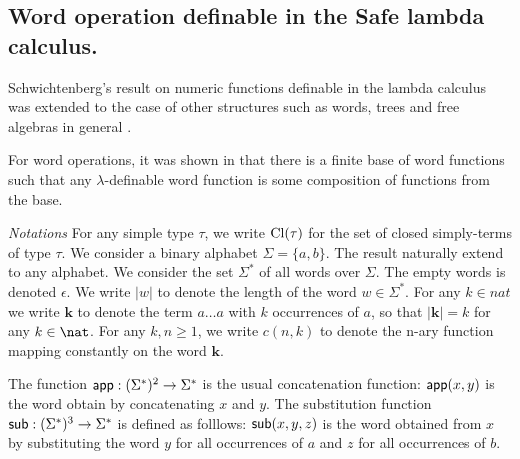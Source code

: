\newcommand{\openedof}[2]{{\rm Op}(#1,#2)} %

\newcommand\wordnum[1]{\mathbf{#1}} %
\newcommand\safedefset{$\lambda^{safe}${\rm def}}

\newcommand\fatlambda{\lambda\kern-0.7em\lambda}
\newcommand\wordapp{{\sf app}}
\newcommand\wordsub{{\sf sub}}


\subsection{Word operation definable in the Safe lambda calculus.}
Schwichtenberg's result on numeric functions definable in the
lambda calculus was extended to the case of other
structures such as
words, trees and free algebras in general
\cite{DBLP:journals/tcs/Leivant93,DBLP:journals/apal/Zaionc91,702481,DBLP:journals/tcs/Zaionc87}.

For word operations, it was shown in
\cite{DBLP:journals/tcs/Zaionc87} that there is a finite base of
word functions such that any $\lambda$-definable word function is
some composition of functions from the base.

\emph{Notations}
For any simple type $\tau$, we write ${\rm Cl}(\tau)$ for the set of closed simply-terms of type $\tau$.
We consider a binary alphabet $\Sigma = \{a,b\}$. The result naturally extend to any alphabet. We consider the set $\Sigma^*$ of all words over $\Sigma$. The empty words is denoted $\epsilon$. We write $|w|$ to denote the length of the word $w\in\Sigma^*$.
For any $k\in nat$ we write $\wordnum{k}$ to denote the
term $a \ldots a$ with $k$ occurrences of $a$, so that $|\wordnum{k}| = k$ for any $k\in\nat$.
For any $k,n\geq 1$, we write $c(n,k)$ to denote the n-ary function mapping constantly on the word $\wordnum{k}$.

The function $\wordapp : (\Sigma^*)^2 \rightarrow \Sigma^*$ is the usual concatenation function: $\wordapp(x,y)$ is the word obtain by concatenating $x$ and $y$. The substitution function $\wordsub : (\Sigma^*)^3 \rightarrow \Sigma^*$ is defined as folllows: $\wordsub(x,y,z)$ is the word obtained from $x$ by substituting the word $y$ for all occurrences of $a$ and $z$ for all occurrences of $b$.
 
